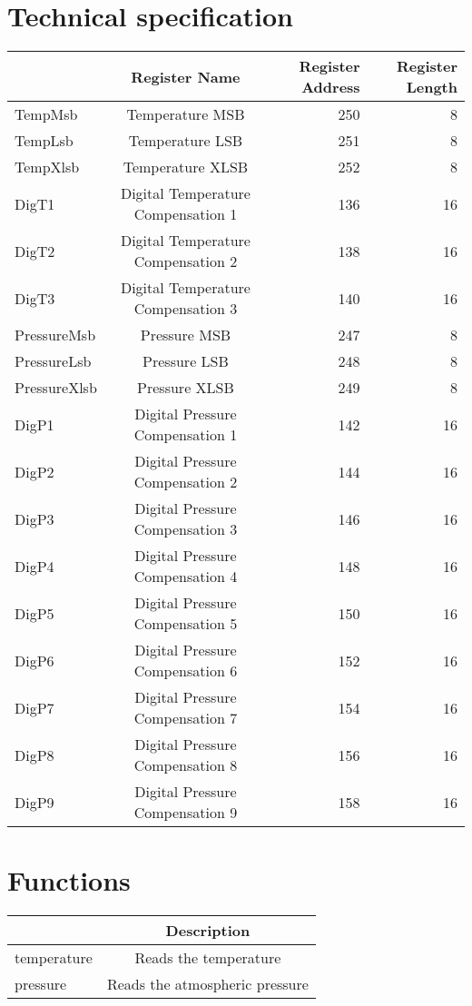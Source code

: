 \documentclass[a4paper,12pt,oneside,pdflatex,italian,final,twocolumn]{article}
\begin{document}
\section{Technical specification}
\centering
\begin{tabular}{lcrr}
\toprule
 & Register Name & Register Address & Register Length \\
\midrule
TempMsb & Temperature MSB & 250 & 8 \\
TempLsb & Temperature LSB & 251 & 8 \\
TempXlsb & Temperature XLSB & 252 & 8 \\
DigT1 & Digital Temperature Compensation 1 & 136 & 16 \\
DigT2 & Digital Temperature Compensation 2 & 138 & 16 \\
DigT3 & Digital Temperature Compensation 3 & 140 & 16 \\
PressureMsb & Pressure MSB & 247 & 8 \\
PressureLsb & Pressure LSB & 248 & 8 \\
PressureXlsb & Pressure XLSB & 249 & 8 \\
DigP1 & Digital Pressure Compensation 1 & 142 & 16 \\
DigP2 & Digital Pressure Compensation 2 & 144 & 16 \\
DigP3 & Digital Pressure Compensation 3 & 146 & 16 \\
DigP4 & Digital Pressure Compensation 4 & 148 & 16 \\
DigP5 & Digital Pressure Compensation 5 & 150 & 16 \\
DigP6 & Digital Pressure Compensation 6 & 152 & 16 \\
DigP7 & Digital Pressure Compensation 7 & 154 & 16 \\
DigP8 & Digital Pressure Compensation 8 & 156 & 16 \\
DigP9 & Digital Pressure Compensation 9 & 158 & 16 \\
\bottomrule
\end{tabular}

\raggedright


\section{Functions}

\centering
\begin{tabular}{lc}
\toprule
  & Description \\
\midrule
temperature & Reads the temperature \\
pressure & Reads the atmospheric pressure \\
\bottomrule
\end{tabular}
\end{document}
